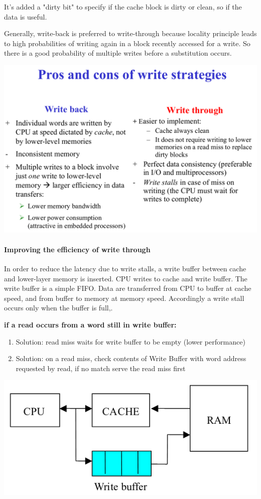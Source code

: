 It's added a "dirty bit" to specify if the cache block is dirty or clean, so if the data is useful.

Generally, write-back is preferred to write-through because locality principle leads to high probabilities of writing again in a block recently accessed for a write. So there is a good probability of multiple writes before a substitution occurs.

\includegraphics[width=\textwidth]{images/write_strategies.png}

\paragraph{Improving the efficiency of write through}
In order to reduce the latency due to write stalls, a write buffer between cache and lower-layer memory is inserted. CPU writes to cache and write buffer. The write buffer is a simple FIFO.
Data are transferred from CPU to buffer at cache speed, and from buffer to memory at memory speed.
Accordingly a write stall occurs only when the buffer is full,.

\textbf{if a read occurs from a word still in write buffer:}
\begin{enumerate}
    \item Solution: read miss waits for write buffer to be empty (lower performance)
    \item Solution: on a read miss, check contents of Write Buffer with word address requested by read, if no match serve the read miss first
\end{enumerate}

\includegraphics[width=.6\textwidth]{images/write_buffer.png}

